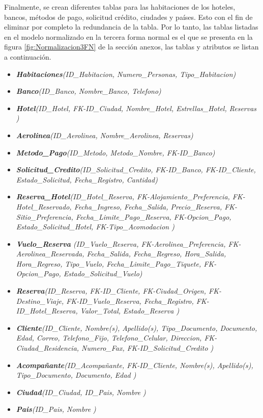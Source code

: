 \documentclass{article}
\begin{document}
Finalmente, se crean diferentes tablas para las habitaciones de los hoteles, bancos, métodos de pago, solicitud crédito, ciudades y países. Esto con el fin de eliminar por completo la redundancia de la tabla. Por lo tanto, las tablas listadas en el modelo normalizado en la tercera forma normal es el que se presenta en la figura \ref{fig:Normalizacion3FN} de la sección anexos, las tablas y atributos se listan a continuación. 
\begin{itemize}
    \item \textit{\textbf{Habitaciones}(ID\_Habitacion, Numero\_Personas, Tipo\_Habitacion)}
    \item \textit{\textbf{Banco}(ID\_Banco, Nombre\_Banco, Telefono)}
    \item \textit{\textbf{Hotel}(ID\_Hotel, FK-ID\_Ciudad, Nombre\_Hotel, Estrellas\_Hotel, Reservas )}
    \item \textit{\textbf{Aerolinea}(ID\_Aerolinea, Nombre\_Aerolinea, Reservas)}
    \item \textit{\textbf{Metodo\_Pago}(ID\_Metodo, Metodo\_Nombre, FK-ID\_Banco)}
    \item \textit{\textbf{Solicitud\_Credito}(ID\_Solicitud\_Credito, FK-ID\_Banco, FK-ID\_Cliente, Estado\_Solicitud, Fecha\_Registro, Cantidad)}
    \item \textit{\textbf{Reserva\_Hotel}(ID\_Hotel\_Reserva, FK-Alojamiento\_Preferencia, FK-Hotel\_Reservado, Fecha\_Ingreso, Fecha\_Salida, Precio\_Reserva, FK-Sitio\_Preferencia, Fecha\_Limite\_Pago\_Reserva, FK-Opcion\_Pago, Estado\_Solicitud\_Hotel, FK-Tipo\_Acomodacion )}
    \item \textit{\textbf{Vuelo\_Reserva} (ID\_Vuelo\_Reserva, FK-Aerolinea\_Preferencia, FK-Aerolinea\_Reservada, Fecha\_Salida, Fecha\_Regreso, Hora\_Salida, Hora\_Regreso, Tipo\_Vuelo, Fecha\_Limite\_Pago\_Tiquete, FK-Opcion\_Pago, Estado\_Solicitud\_Vuelo)}
    \item \textit{\textbf{Reserva}(ID\_Reserva, FK-ID\_Cliente, FK-Ciudad\_Origen, FK-Destino\_Viaje, FK-ID\_Vuelo\_Reserva, Fecha\_Registro, FK-ID\_Hotel\_Reserva, Valor\_Total, Estado\_Reserva )}
    \item \textit{\textbf{Cliente}(ID\_Cliente, Nombre(s), Apellido(s), Tipo\_Documento, Documento, Edad, Correo, Telefono\_Fijo, Telefono\_Celular, Direccion, FK-Ciudad\_Residencia, Numero\_Fax, FK-ID\_Solicitud\_Credito )}
    \item \textit{\textbf{Acompañante}(ID\_Acompañante, FK-ID\_Cliente, Nombre(s), Apellido(s), Tipo\_Documento, Documento, Edad )}
    \item \textit{\textbf{Ciudad}(ID\_Ciudad, ID\_Pais, Nombre ) }
    \item \textit{\textbf{Pais}(ID\_Pais, Nombre )}
\end{itemize}
\end{document}

